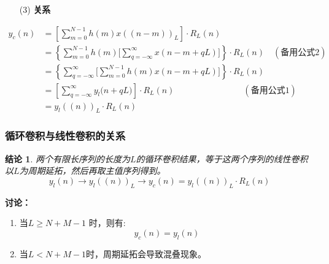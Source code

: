 \documentclass[notheorems,compress,mathserif,table]{beamer}
\newtheorem{jielun}{结论}
\begin{document}
\begin{frame}[shrink]\frametitle{}%
\begin{enumerate}
  \item [(3)] \textbf{关系}  \par
\end{enumerate}  
  \begin{equation*}
    \begin{split}
    y_c(n)  &= \left[ \sum_{m=0}^{N-1} h(m) x((n-m))_L \right] \cdot R_L(n)\\
            &= \left\{ \sum_{m=0}^{N-1} h(m) \bigg[ \sum_{q=-\infty}^{\infty}x(n-m +qL)
                \bigg] \right\} \cdot R_L(n)  \quad(\mbox{备用公式2})\\
            &= \left\{ \sum_{q=-\infty}^{\infty} \bigg[ \sum_{m=0}^{N-1} h(m)x(n-m +qL)
                \bigg] \right\} \cdot R_L(n)  \\
            &= \left[ \sum_{q=-\infty}^{\infty}  y_l\big(n+qL\big)\right]  \cdot R_L(n)
               \quad\quad\quad\quad\quad\quad\quad\quad(\mbox{备用公式1}) \\
            &= y_l((n))_L \cdot R_L(n)
    \end{split}
  \end{equation*}

\end{frame}

\begin{frame}[shrink]\frametitle{循环卷积与线性卷积的关系}%
%
%
\begin{jielun}

   \quad\quad 两个有限长序列的长度为$L$的循环卷积结果，等于这两个序列的线性卷积以$L$为周期延拓，然后再取主值序列得到。
    $$y_l(n)  \longrightarrow  y_l((n))_L \longrightarrow   y_c(n) =  y_l((n))_L\cdot R_L(n) $$
\end{jielun}
%
%

   \textbf{讨论：}
    \begin{enumerate}
      \item 当$L\geq N+M-1$ 时，则有: \vspace{-0.3cm}
      $$y_c(n) = y_l(n)$$%
      \item 当$L < N+M-1$时，周期延拓会导致混叠现象。
    \end{enumerate}

\end{frame}
%
\end{document}
